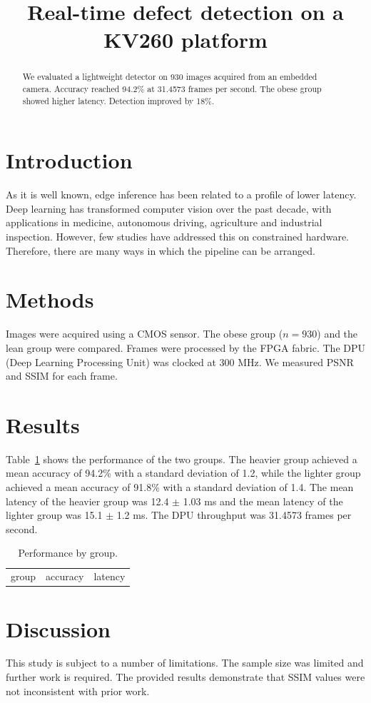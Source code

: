 \documentclass{article}
\begin{document}
\title{Real-time defect detection on a KV260 platform}

\begin{abstract}
We evaluated a lightweight detector on 930 images acquired from an embedded
camera. Accuracy reached 94.2\% at 31.4573 frames per second. The obese group
showed higher latency. Detection improved by 18\%.
\end{abstract}

\section{Introduction}
As it is well known, edge inference has been related to a profile of lower
latency. Deep learning has transformed computer vision over the past decade,
with applications in medicine, autonomous driving, agriculture and industrial
inspection. However, few studies have addressed this on constrained hardware.
Therefore, there are many ways in which the pipeline can be arranged.

\section{Methods}
Images were acquired using a CMOS sensor. The obese group ($n = 930$) and the
lean group were compared. Frames were processed by the FPGA fabric. The DPU
(Deep Learning Processing Unit) was clocked at 300 MHz. We measured PSNR and
SSIM for each frame.

\section{Results}
Table~\ref{tab:acc} shows the performance of the two groups. The heavier group
achieved a mean accuracy of 94.2\% with a standard deviation of 1.2, while the
lighter group achieved a mean accuracy of 91.8\% with a standard deviation of
1.4. The mean latency of the heavier group was 12.4 $\pm$ 1.03 ms and the mean
latency of the lighter group was 15.1 $\pm$ 1.2 ms. The DPU throughput was
31.4573 frames per second.

\begin{table}[t]
\caption{Performance by group.}
\label{tab:acc}
\begin{tabular}{lcc}
group & accuracy & latency \\
\end{tabular}
\end{table}

\section{Discussion}
This study is subject to a number of limitations. The sample size was limited
and further work is required. The provided results demonstrate that SSIM values
were not inconsistent with prior work.
\end{document}
